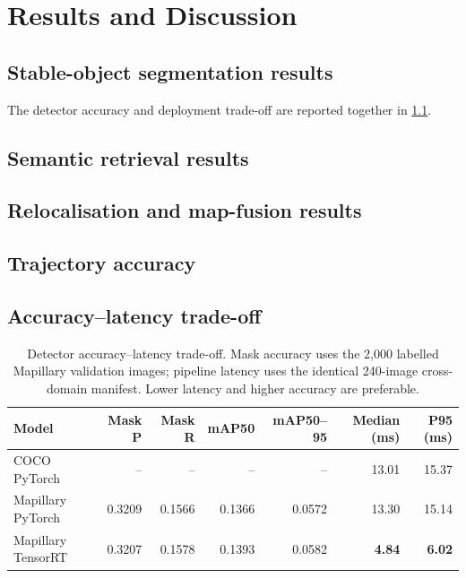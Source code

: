 \chapter{Results and Discussion}
\label{chap:results}

\section{Stable-object segmentation results}

The detector accuracy and deployment trade-off are reported together in
\cref{tab:detector-tradeoff}.

\section{Semantic retrieval results}

\section{Relocalisation and map-fusion results}

\section{Trajectory accuracy}

\section{Accuracy--latency trade-off}

\begin{table}[htbp]
  \centering
  \caption{Detector accuracy--latency trade-off. Mask accuracy uses the 2,000
  labelled Mapillary validation images; pipeline latency uses the identical
  240-image cross-domain manifest. Lower latency and higher accuracy are
  preferable.}
  \label{tab:detector-tradeoff}
  \small
  \begin{tabular}{@{}lrrrrrr@{}}
    \toprule
    Model & Mask P & Mask R & mAP50 & mAP50--95 & Median (ms) & P95 (ms) \\
    \midrule
    COCO PyTorch       & --     & --     & --     & --     & 13.01 & 15.37 \\
    Mapillary PyTorch  & 0.3209 & 0.1566 & 0.1366 & 0.0572 & 13.30 & 15.14 \\
    Mapillary TensorRT & 0.3207 & 0.1578 & 0.1393 & 0.0582 & \textbf{4.84} & \textbf{6.02} \\
    \bottomrule
  \end{tabular}
\end{table}

